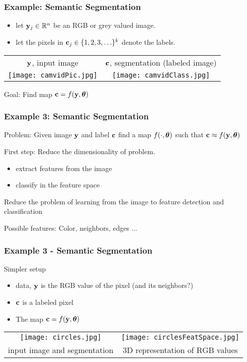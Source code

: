 \documentclass[12pt,fleqn]{beamer}
\begin{document}
\begin{frame}\frametitle{Example:  Semantic Segmentation}

\begin{itemize}
	\item
	let ${\bf y}_j \in \mathbb{R}^n$ be an RGB or grey valued image.
	\item let the pixels in ${\bf c}_j\in \{1,2,3,\ldots \}^k$ denote the labels.
\end{itemize}

\begin{center}
	\begin{tabular}{cc}
		${\bf y}$, input image & ${\bf c}$, segmentation (labeled image)\\
	\texttt{[image: camvidPic.jpg]} &
	\texttt{[image: camvidClass.jpg]} 
	\end{tabular}

	Goal: Find map ${\bf c}  = f({\bf y},{\boldsymbol \theta})$ 

\end{center}


\end{frame}

\begin{frame}\frametitle{Example 3: Semantic Segmentation}

Problem: Given image ${\bf y}$ and label ${\bf c}$ find a map $f(\cdot,{\boldsymbol \theta})$ such that ${\bf c}  \approx f({\bf y},{\boldsymbol \theta})$ 

\bigskip
\pause

First step: Reduce the dimensionality of problem.
\begin{itemize}
\item extract features from the image
\item classify in the feature space
\end{itemize}

Reduce the problem of learning from the image to feature
detection and classification

\pause
\bigskip

Possible features: Color, neighbors, edges ...

\bigskip


\end{frame}


\begin{frame}\frametitle{Example 3 - Semantic Segmentation}


Simpler setup
\begin{itemize}
\item data, ${\bf y}$ is the RGB value of the pixel (and its neighbors?)  
\item ${\bf c}$ is a labeled pixel
\item The map ${\bf c}  = f({\bf y},{\boldsymbol \theta})$ 
\end{itemize}

\begin{tabular}{cc}
\texttt{[image: circles.jpg]} &
\texttt{[image: circlesFeatSpace.jpg]} \\
input image and segmentation & 3D representation of RGB values \\
\end{tabular}

\end{frame}
\end{document}
